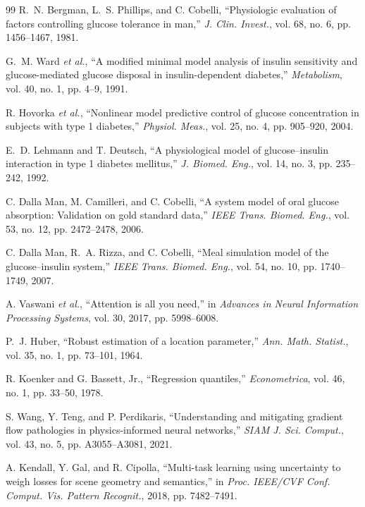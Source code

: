 \documentclass[journal]{IEEEtran}
\begin{document}
\begin{thebibliography}{99}
\label{ref32label} R.~N. Bergman, L.~S. Phillips, and C. Cobelli, ``Physiologic evaluation of factors controlling glucose tolerance in man,'' \emph{J. Clin. Invest.}, vol. 68, no. 6, pp. 1456--1467, 1981.

\label{ref33label} G.~M. Ward \emph{et al.}, ``A modified minimal model analysis of insulin sensitivity and glucose-mediated glucose disposal in insulin-dependent diabetes,'' \emph{Metabolism}, vol. 40, no. 1, pp. 4--9, 1991.

\label{ref34label} R. Hovorka \emph{et al.}, ``Nonlinear model predictive control of glucose concentration in subjects with type 1 diabetes,'' \emph{Physiol. Meas.}, vol. 25, no. 4, pp. 905--920, 2004.

\label{ref35label}E.~D. Lehmann and T. Deutsch, ``A physiological model of glucose--insulin interaction in type 1 diabetes mellitus,'' \emph{J. Biomed. Eng.}, vol. 14, no. 3, pp. 235--242, 1992.

\label{ref36label} C. Dalla Man, M. Camilleri, and C. Cobelli, ``A system model of oral glucose absorption: Validation on gold standard data,'' \emph{IEEE Trans. Biomed. Eng.}, vol. 53, no. 12, pp. 2472--2478, 2006.

\label{ref37label} C. Dalla Man, R.~A. Rizza, and C. Cobelli, ``Meal simulation model of the glucose--insulin system,'' \emph{IEEE Trans. Biomed. Eng.}, vol. 54, no. 10, pp. 1740--1749, 2007.

\label{ref38label} A. Vaswani \emph{et al.}, ``Attention is all you need,'' in \emph{Advances in Neural Information Processing Systems}, vol. 30, 2017, pp. 5998--6008.

\label{ref39label} P.~J. Huber, ``Robust estimation of a location parameter,'' \emph{Ann. Math. Statist.}, vol. 35, no. 1, pp. 73--101, 1964.

\label{ref40label} R. Koenker and G. Bassett, Jr., ``Regression quantiles,'' \emph{Econometrica}, vol. 46, no. 1, pp. 33--50, 1978.

\label{ref41label} S. Wang, Y. Teng, and P. Perdikaris, ``Understanding and mitigating gradient flow pathologies in physics-informed neural networks,'' \emph{SIAM J. Sci. Comput.}, vol. 43, no. 5, pp. A3055--A3081, 2021.

\label{ref42label} A. Kendall, Y. Gal, and R. Cipolla, ``Multi-task learning using uncertainty to weigh losses for scene geometry and semantics,'' in \emph{Proc. IEEE/CVF Conf. Comput. Vis. Pattern Recognit.}, 2018, pp. 7482--7491.


\end{thebibliography}
\end{document}
